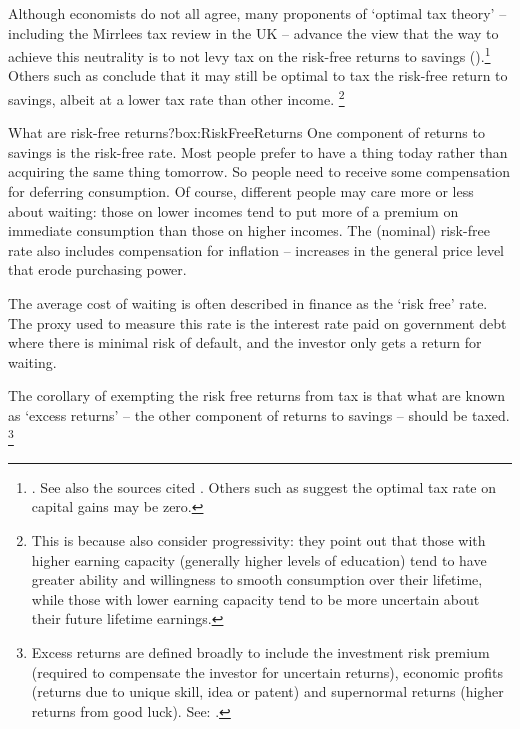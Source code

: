\documentclass{grattanAlpha}\usepackage[]{graphicx}\usepackage[]{color}
\begin{document}
Although economists do not all agree, many proponents of ‘optimal tax theory’ – including the Mirrlees tax review in the UK  – advance the view that the way to achieve this neutrality is to not levy tax on the risk-free returns to savings ().\footnote{\textcite[][284]{MirrleesAdamBesleyEtAl2011}. See also the sources cited \textcite[][2]{Ingles2015}. Others such as \textcite[][1]{Carling2015} suggest the optimal tax rate on capital gains may be zero.} 
Others such as \textcite{BanksDiamond2008}\DEVIATION{} %
conclude that it may still be optimal to tax the risk-free return to savings, albeit at a lower tax rate than other income.%
\footnote{This is because \textcite{BanksDiamond2008} also consider progressivity: they point out that those with higher earning capacity (generally higher levels of education) tend to have greater ability and willingness to smooth consumption over their lifetime, while those with lower earning capacity tend to be more uncertain about their future lifetime earnings.}  

\begin{smallbox}[tbp]{What are risk-free returns?}{box:RiskFreeReturns}
One component of returns to savings is the risk-free rate. Most people prefer to have a thing today rather than acquiring the same thing tomorrow. So people need to receive some compensation for deferring consumption. Of course, different people may care more or less about waiting: those on lower incomes tend to put more of a premium on immediate consumption than those on higher incomes.   The (nominal) risk-free rate also includes compensation for inflation – increases in the general price level that erode purchasing power. 

The average cost of waiting is often described in finance as the ‘risk free’ rate. The proxy used to measure this rate is the interest rate paid on government debt where there is minimal risk of default, and the investor only gets a return for waiting. 
\end{smallbox}

The corollary of exempting the risk free returns from tax is that what are known as ‘excess returns’ – the other component of returns to savings – should be taxed.%
\footnote{Excess returns are defined broadly to include the investment risk premium (required to compensate the investor for uncertain returns), economic profits (returns due to unique skill, idea or patent) and supernormal returns (higher returns from good luck). See: \textcite[][153]{PresidentsAdvisoryPanelTaxReform2005Proposals}.}
\end{document}
